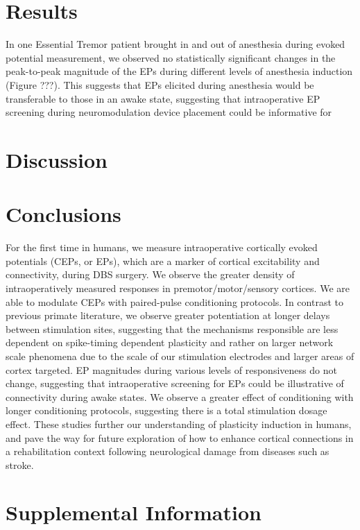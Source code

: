 \section{Results}

In one Essential Tremor patient brought in and out of anesthesia during evoked potential measurement, we observed no statistically significant changes in the peak-to-peak magnitude of the EPs during different levels of anesthesia induction (Figure ???). This suggests that EPs elicited during anesthesia would be transferable to those in an awake state, suggesting that intraoperative EP screening during neuromodulation device placement could be informative for 

\section{Discussion}

\section{Conclusions}

For the first time in humans, we measure intraoperative cortically evoked potentials (CEPs, or EPs), which are a marker of cortical excitability and connectivity, during DBS surgery.
We observe the greater density of intraoperatively measured responses in premotor/motor/sensory cortices. 
We are able to modulate CEPs with paired-pulse conditioning protocols.
In contrast to previous primate literature, we observe greater potentiation at longer delays between stimulation sites, suggesting that the mechanisms responsible are less dependent on spike-timing dependent plasticity and rather on larger network scale phenomena due to the scale of our stimulation electrodes and larger areas of cortex targeted.
EP magnitudes during various levels of responsiveness do not change, suggesting that intraoperative screening for EPs could be illustrative of connectivity during awake states. 
We observe a greater effect of conditioning with longer conditioning protocols, suggesting there is a total stimulation dosage effect. 
These studies further our understanding of plasticity induction in humans, and pave the way for future exploration of how to enhance cortical connections in a rehabilitation context following neurological damage from diseases such as stroke. 


\section{Supplemental Information}